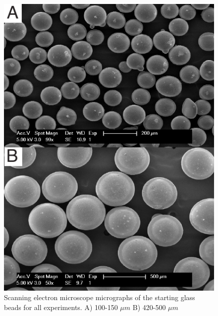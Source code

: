 \begin{figure}
\includegraphics[width=30pc]{chap_electrical/sem_initial.pdf}
\caption{Scanning electron microscope micrographs of the starting glass beads for all experiments.  A) 100-150 $\mu m$ B) 420-500 $\mu m$}
\label{starting_SEM}
\end{figure}

